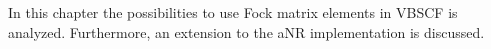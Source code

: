 In this chapter the possibilities to use Fock matrix elements in VBSCF is analyzed. Furthermore, an extension to the aNR implementation is discussed.

% 
%
